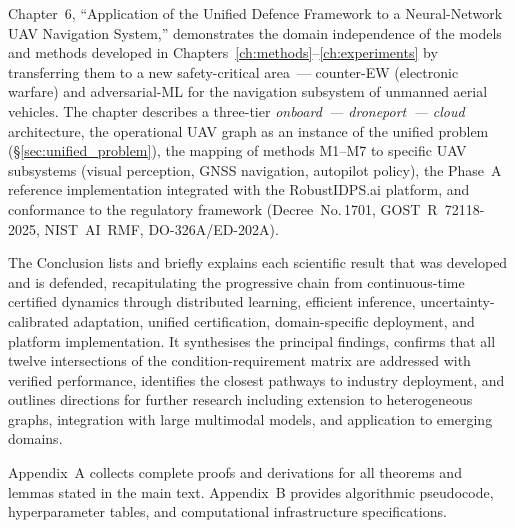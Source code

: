 Chapter~6, ``Application of the Unified Defence Framework to a
Neural-Network UAV Navigation System,'' demonstrates the domain
independence of the models and methods developed in
Chapters~\ref{ch:methods}--\ref{ch:experiments} by transferring them
to a new safety-critical area~--- counter-EW (electronic warfare) and
adversarial-ML for the navigation subsystem of unmanned aerial
vehicles. The chapter describes a three-tier
\emph{onboard~--- droneport~--- cloud} architecture, the operational
UAV graph as an instance of the unified problem (\S\ref{sec:unified_problem}),
the mapping of methods \textsf{M1}--\textsf{M7} to specific UAV
subsystems (visual perception, GNSS navigation, autopilot policy),
the Phase~A reference implementation integrated with the
\textsf{RobustIDPS.ai} platform, and conformance to the regulatory
framework (Decree~No.\,1701, \mbox{GOST~R~72118-2025},
\mbox{NIST~AI~RMF}, \mbox{DO-326A/ED-202A}).

The Conclusion lists and briefly explains each scientific result that was developed and is defended, recapitulating the progressive chain from continuous-time certified dynamics through distributed learning, efficient inference, uncertainty-calibrated adaptation, unified certification, domain-specific deployment, and platform implementation. It synthesises the principal findings, confirms that all twelve intersections of the condition-requirement matrix are addressed with verified performance, identifies the closest pathways to industry deployment, and outlines directions for further research including extension to heterogeneous graphs, integration with large multimodal models, and application to emerging domains.

Appendix~A collects complete proofs and derivations for all theorems and lemmas stated in the main text. Appendix~B provides algorithmic pseudocode, hyperparameter tables, and computational infrastructure specifications.

